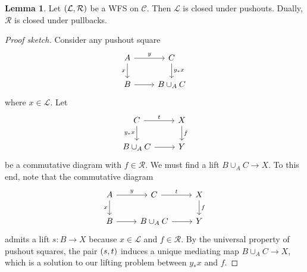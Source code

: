 \documentclass[10pt,letterpaper,cm]{nupset}
\theoremstyle{definition}
\theoremstyle{theorem}
\newtheorem{lemma}[definition]{Lemma}
\theoremstyle{remark}
\renewcommand{\L}{\mathcal L}
\newcommand{\RI}{\mathcal R}
\newcommand{\0}{\mathbf{0}}
\newcommand{\1}{\mathbf{1}}
\newcommand{\2}{\mathbf{2}}
\renewcommand{\c}{\mathscr{C}}
\begin{document}
\medskip

\begin{lemma}\label{CP}
Let $\mleft(\L, \RI\mright)$ be a WFS on $\c$. Then $\L$ is closed under pushouts. Dually, $\RI$ is closed under pullbacks.
\end{lemma}
\begin{proof}[Proof sketch]
Consider any pushout square
\[
\begin{tikzcd}
A \arrow[d, "x"'] \arrow[r, "y"] & C \arrow[d, "y_{\ast}{x}"] \\
B \arrow[r]                      & B\cup_A C              
\end{tikzcd}
\] where $x\in \L$.  Let 
\[
\begin{tikzcd}
C \arrow[d, "y_{\ast}{x}"'] \arrow[r, "t"] & X \arrow[d, "f"] \\
B\cup_A C \arrow[r]                & Y               
\end{tikzcd}
\] be a commutative diagram with $f\in \RI$. We must find a lift $B\cup_A C \to X$. To this end, note that the commutative diagram
\[
\begin{tikzcd}
A \arrow[r, "y"] \arrow[d, "x"'] & C \arrow[r, "t"]         & X \arrow[d, "f"] \\
B \arrow[r]                      & B\cup_A C \arrow[r] & Y               
\end{tikzcd}
\] admits a lift  $s: B \to X$ because $x\in \L$ and $f\in \RI$. By the universal property of pushout squares, the pair $\mleft(s, t\mright)$ induces a unique mediating map $B\cup_A C \to X$, which is a solution to our lifting problem between $y_{\ast}{x}$ and $f$.
\end{proof}
\end{document}

